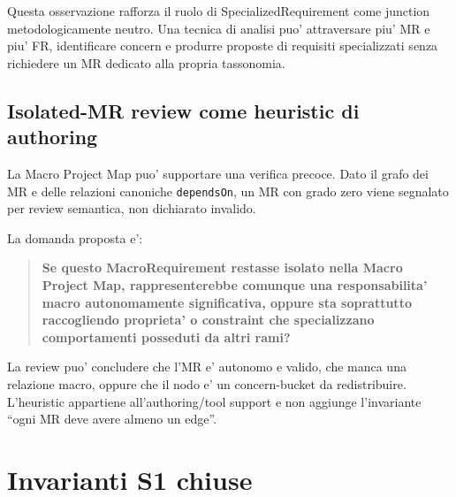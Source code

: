 \documentclass[11pt,a4paper]{article}
\begin{document}
Questa osservazione rafforza il ruolo di SpecializedRequirement come junction metodologicamente neutro. Una tecnica di analisi puo' attraversare piu' MR e piu' FR, identificare concern e produrre proposte di requisiti specializzati senza richiedere un MR dedicato alla propria tassonomia.

\subsection*{Isolated-MR review come heuristic di authoring}

La Macro Project Map puo' supportare una verifica precoce. Dato il grafo dei MR e delle relazioni canoniche \texttt{dependsOn}, un MR con grado zero viene segnalato per review semantica, non dichiarato invalido.

La domanda proposta e':

\begin{quote}
\textbf{Se questo MacroRequirement restasse isolato nella Macro Project Map, rappresenterebbe comunque una responsabilita' macro autonomamente significativa, oppure sta soprattutto raccogliendo proprieta' o constraint che specializzano comportamenti posseduti da altri rami?}
\end{quote}

La review puo' concludere che l'MR e' autonomo e valido, che manca una relazione macro, oppure che il nodo e' un concern-bucket da redistribuire. L'heuristic appartiene all'authoring/tool support e non aggiunge l'invariante ``ogni MR deve avere almeno un edge''.

\section{Invarianti S1 chiuse}
\end{document}
